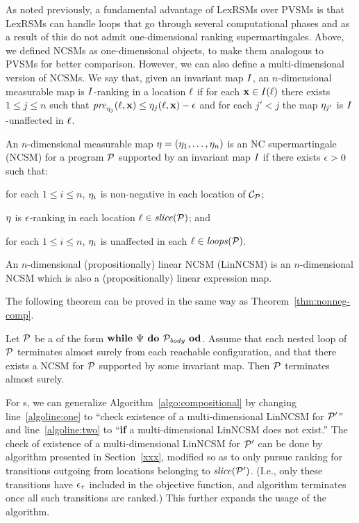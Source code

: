As noted previously, a fundamental advantage of LexRSMs over PVSMs is that LexRSMs can handle loops that go through several computational phases and as a result of this do not admit one-dimensional ranking supermartingales. Above, we defined NCSMs as one-dimensional objects, to make them analogous to PVSMs for better comparison. However, we can also define a multi-dimensional version of NCSMs. We say that, given an invariant map $I$, an $n$-dimensional measurable map is $I$-ranking in a location $\ell$ if for each $\mathbf{x}\in I(\ell)$ there exists $1\leq j \leq n$ such that $\mathit{pre}_{\eta_j}(\ell,\mathbf{x}) \leq \eta_j(\ell,\mathbf{x})-\epsilon$ and for each $j'<j$ the map $\eta_{j'}$ is $I$-unaffected in $\ell$.

\begin{definition}
An $n$-dimensional measurable map $\mathbf{\eta}=(\eta_1,\dots,\eta_n)$ is an NC supermartingale (NCSM) for a program $\mathcal{P}$ supported by an invariant map $I$ if there exists $\epsilon>0$ such that:
\begin{compactenum}
	\item  for each $1\leq i \leq n$, $\eta_i$ is non-negative in each location of $\mathcal{C}_{\mathcal{P}}$;
	\item 
	$\mathbf{\eta}$ is $\epsilon$-ranking in each location $\ell\in\mathit{slice}{(\mathcal{P})}$; and
	\item 
	for each $1\leq i \leq n$, $\eta_i$ is
	unaffected in each $\ell\in\mathit{loops}(\mathcal{P})$.
\end{compactenum}
An $n$-dimensional (propositionally) linear NCSM (LinNCSM) is an $n$-dimensional NCSM which is also a (propositionally) linear expression map.
\end{definition}

The following theorem can be proved in the same way as Theorem~\ref{thm:nonneg-comp}.

\begin{theorem}
Let $\mathcal{P}$ be a \PP{} of the form $\textbf{while } \Psi \textbf{ do } 
\mathcal{P}_{\mathit{body}} \textbf{ od}$. Assume that each nested loop of $\mathcal{P}$ terminates almost surely from each reachable configuration, and that there exists a NCSM for $\mathcal{P}$ supported by some invariant map. Then $\mathcal{P}$ terminates almost surely.
\end{theorem}

For \APP{}s, we can generalize Algorithm~\ref{algo:compositional} by changing line~\ref{algoline:one} to ``check existence of a multi-dimensional LinNCSM for $\mathcal{P}'$'' and line~\ref{algoline:two} to ``\textbf{if} a multi-dimensional LinNCSM does not exist.'' The check of existence of a multi-dimensional LinNCSM for $\mathcal{P}'$ can be done by algorithm presented in Section~\ref{xxx}, modified so as to only pursue ranking for transitions outgoing from locations belonging to $\mathit{slice}(\mathcal{P}')$. (I.e., only these transitions have $\epsilon_{\tau}$ included in the objective function, and algorithm terminates once all such transitions are ranked.) This further expands the usage of the algorithm.

